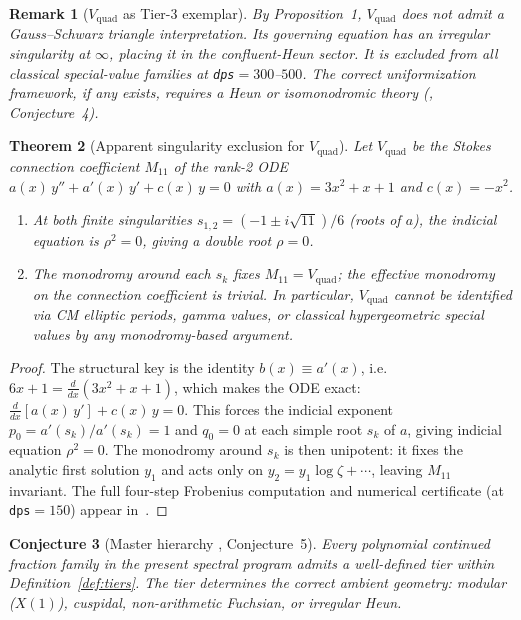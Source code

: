 \documentclass[12pt]{amsart}
\newtheorem{theorem}{Theorem}[section]
\newtheorem{conjecture}[theorem]{Conjecture}
\newtheorem{remark}[theorem]{Remark}
\begin{document}
\begin{remark}[$V_{\mathrm{quad}}$ as Tier-3
  exemplar]
By \cite{Obstruction} Proposition~1,
$V_{\mathrm{quad}}$ does not admit a
Gauss--Schwarz triangle interpretation.
Its governing equation has an irregular
singularity at $\infty$, placing it in the
confluent-Heun sector.
It is excluded from all classical special-value
families at \texttt{dps}$=300$--$500$.
The correct uniformization framework, if any
exists, requires a Heun or isomonodromic
theory (\cite{Obstruction}, Conjecture~4).
\end{remark}

\begin{theorem}[Apparent singularity exclusion
  for $V_{\mathrm{quad}}$]
\label{thm:exclusion2}
Let $V_{\mathrm{quad}}$ be the Stokes connection
coefficient $M_{11}$ of the rank-2 ODE
$a(x)\,y''+a'(x)\,y'+c(x)\,y=0$ with
$a(x)=3x^2+x+1$ and $c(x)=-x^2$.
\begin{enumerate}
\item[\textup{(i)}]
  At both finite singularities
  $s_{1,2}=(-1\pm i\sqrt{11})/6$
  (roots of $a$), the indicial equation
  is $\rho^2=0$, giving a double root
  $\rho=0$.
\item[\textup{(ii)}]
  The monodromy around each $s_k$ fixes
  $M_{11}=V_{\mathrm{quad}}$; the effective
  monodromy on the connection coefficient
  is trivial. In particular, $V_{\mathrm{quad}}$
  cannot be identified via CM elliptic periods,
  gamma values, or classical hypergeometric
  special values by any monodromy-based argument.
\end{enumerate}
\end{theorem}

\begin{proof}
The structural key is the identity
$b(x) \equiv a'(x)$, i.e.\
$6x+1 = \frac{d}{dx}(3x^2+x+1)$,
which makes the ODE exact:
$\frac{d}{dx}[a(x)\,y'] + c(x)\,y = 0$.
This forces the indicial exponent
$p_0 = a'(s_k)/a'(s_k) = 1$ and
$q_0 = 0$ at each simple root $s_k$
of $a$, giving indicial equation
$\rho^2 = 0$. The monodromy around
$s_k$ is then unipotent: it fixes
the analytic first solution $y_1$
and acts only on $y_2 = y_1\log\zeta
+ \cdots$, leaving $M_{11}$
invariant.
The full four-step Frobenius computation
and numerical certificate (at
\texttt{dps}$=150$) appear
in~\cite{Vquad}.
\end{proof}

\begin{conjecture}[Master hierarchy
  {\cite{Obstruction}, Conjecture~5}]
\label{conj:master}
Every polynomial continued fraction family in
the present spectral program admits a
well-defined tier within
Definition~\ref{def:tiers}. The tier
determines the correct ambient geometry:
modular ($X(1)$), cuspidal, non-arithmetic
Fuchsian, or irregular Heun.
\end{conjecture}
\end{document}
